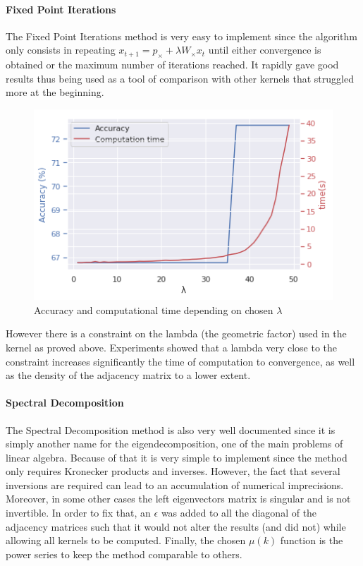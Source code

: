 \documentclass{article}
\theoremstyle{definition}
\begin{document}
\paragraph{Fixed Point Iterations}
The Fixed Point Iterations method is very easy to implement since the algorithm only consists in repeating $x_{t+1}=p_{\times}+\lambda W_{\times}x_t$ until either convergence is obtained or the maximum number of iterations reached. It rapidly gave good results thus being used as a tool of comparison with other kernels that struggled more at the beginning.
\begin{figure}[!htb]
	\centering
	\includegraphics[width=0.7\linewidth]{data/fixed_point/acc_comp_time_fct_lambda.png}
	\caption{Accuracy and computational time depending on chosen $\lambda$}
\end{figure}
However there is a constraint on the lambda (the geometric factor) used in the kernel as proved above. Experiments showed that a lambda very close to the constraint increases significantly the time of computation to convergence, as well as the density of the adjacency matrix to a lower extent.

\paragraph{Spectral Decomposition}
The Spectral Decomposition method is also very well documented since it is simply another name for the eigendecomposition, one of the main problems of linear algebra. Because of that it is very simple to implement since the method only requires Kronecker products and inverses. However, the fact that several inversions are required can lead to an accumulation of numerical imprecisions. Moreover, in some other cases the left eigenvectors matrix is singular and is not invertible. In order to fix that, an $\epsilon$ was added to all the diagonal of the adjacency matrices such that it would not alter the results (and did not) while allowing all kernels to be computed. Finally, the chosen $\mu(k)$ function is the power series to keep the method comparable to others.
\end{document}
